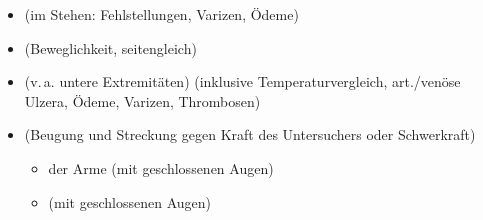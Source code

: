 {
\begin{itemize}
  \item {} (im Stehen: Fehlstellungen, Varizen, Ödeme)
  \item {}
  (Beweglichkeit, seitengleich)
  \item {} (v.\,a.
  untere Extremitäten) (inklusive Temperaturvergleich, art./venöse
  Ulzera, Ödeme, Varizen, Thrombosen)
\end{itemize}
}
{}
{}
{}
{}

{
\begin{itemize}
  \item {}  (Beugung und
  Streckung gegen Kraft des Untersuchers oder Schwerkraft)
  \begin{itemize}
    \item {} der Arme (mit geschlossenen Augen)
    \item {} (mit geschlossenen
    Augen)


\end{itemize}
\end{itemize}}
